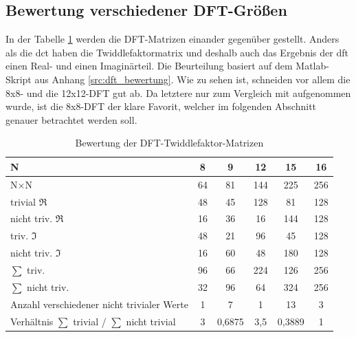 \subsection{Bewertung verschiedener DFT-Größen}\label{sec:AnalyseBewertungTwiddlefaktornMatrizen}

In der Tabelle \ref{tab:DFT-TwiddlefaktorMatrizenBewertung} werden die DFT-Matrizen einander gegenüber gestellt.
Anders als die \gls{dct} haben die Twiddlefaktormatrix und deshalb auch das Ergebnis der \gls{dft} einen Real- und einen Imaginärteil.
Die Beurteilung basiert auf dem Matlab-Skript aus Anhang \ref{src:dft_bewertung}. 
Wie zu sehen ist, schneiden vor allem die 8x8- und die 12x12-DFT gut ab. Da letztere nur zum Vergleich mit aufgenommen wurde, ist die 
8x8-DFT der klare Favorit, welcher im folgenden Abschnitt genauer betrachtet werden soll.


 \vspace{1cm}
 \begingroup
  \renewcommand*{\arraystretch}{1.2} %
  \begin{table}[!ht]
  \centering
  \caption{Bewertung der DFT-Twiddlefaktor-Matrizen}
   \begin{tabular}{lccccc}
   \hline
    N							& 8	& 9	& 12	& 15		& 16 \\
    \hline
    N$\times$N						& 64	& 81	& 144	& 225		& 256 \\
    \rowcolor{lightgray}
    trivial $\Re$ 					& 48	& 45	& 128	& 81		& 128 \\
    \rowcolor{lightgray}
    nicht triv. $\Re$					& 16	& 36	& 16	& 144		& 128 \\
    triv. $\Im$ 					& 48	& 21	& 96	& 45		& 128 \\
    nicht triv. $\Im$ 					& 16	& 60	& 48	& 180		& 128 \\
    \rowcolor{lightgray}
    $\sum$ triv. 					& 96	& 66	& 224	& 126		& 256 \\
    \rowcolor{lightgray}
    $\sum$ nicht triv. 					& 32	& 96	& 64	& 324		& 256 \\
    Anzahl verschiedener nicht trivialer Werte          & 1     & 7     & 1     & 13            & 3 \\
    Verhältnis  $\sum$ trivial / $\sum$ nicht trivial	& 3	& 0,6875& 3,5	& 0,3889	& 1\\
    \hline
   \end{tabular}
   \label{tab:DFT-TwiddlefaktorMatrizenBewertung}
  \end{table}
 \endgroup
 \vspace{1cm}
 
